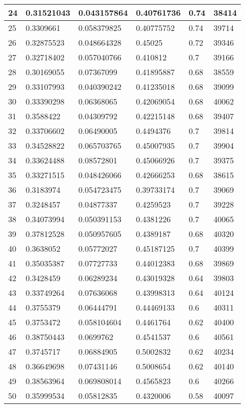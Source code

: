 \begin{longtable}{|l|l|l|l|l|l|}
24 & 0.31521043 & 0.043157864 & 0.40761736 & 0.74 & 38414 \\ \hline 
25 & 0.3309661 & 0.058379825 & 0.40775752 & 0.74 & 39714 \\ \hline 
26 & 0.32875523 & 0.048664328 & 0.45025 & 0.72 & 39346 \\ \hline 
27 & 0.32718402 & 0.057040766 & 0.410812 & 0.7 & 39166 \\ \hline 
28 & 0.30169055 & 0.07367099 & 0.41895887 & 0.68 & 38559 \\ \hline 
29 & 0.33107993 & 0.040390242 & 0.41235018 & 0.68 & 39099 \\ \hline 
30 & 0.33390298 & 0.06368065 & 0.42069054 & 0.68 & 40062 \\ \hline 
31 & 0.3588422 & 0.04309792 & 0.42215148 & 0.68 & 39407 \\ \hline 
32 & 0.33706602 & 0.06490005 & 0.4494376 & 0.7 & 39814 \\ \hline 
33 & 0.34528822 & 0.065703765 & 0.45007935 & 0.7 & 39904 \\ \hline 
34 & 0.33624488 & 0.08572801 & 0.45066926 & 0.7 & 39375 \\ \hline 
35 & 0.33271515 & 0.048426066 & 0.42666253 & 0.68 & 38615 \\ \hline 
36 & 0.3183974 & 0.054723475 & 0.39733174 & 0.7 & 39069 \\ \hline 
37 & 0.3248457 & 0.04877337 & 0.4259523 & 0.7 & 39228 \\ \hline 
38 & 0.34073994 & 0.050391153 & 0.4381226 & 0.7 & 40065 \\ \hline 
39 & 0.37812528 & 0.050957605 & 0.4389187 & 0.68 & 40320 \\ \hline 
40 & 0.3638052 & 0.05772027 & 0.45187125 & 0.7 & 40399 \\ \hline 
41 & 0.35035387 & 0.07727733 & 0.44012383 & 0.68 & 39869 \\ \hline 
42 & 0.3428459 & 0.06289234 & 0.43019328 & 0.64 & 39803 \\ \hline 
43 & 0.33749264 & 0.07636068 & 0.43998313 & 0.64 & 40124 \\ \hline 
44 & 0.3755379 & 0.06444791 & 0.44469133 & 0.6 & 40311 \\ \hline 
45 & 0.3753472 & 0.058104604 & 0.4461764 & 0.62 & 40400 \\ \hline 
46 & 0.38750443 & 0.0699762 & 0.4541537 & 0.6 & 40561 \\ \hline 
47 & 0.3745717 & 0.06884905 & 0.5002832 & 0.62 & 40234 \\ \hline 
48 & 0.36649698 & 0.07431146 & 0.5008654 & 0.62 & 40140 \\ \hline 
49 & 0.38563964 & 0.069808014 & 0.4565823 & 0.6 & 40266 \\ \hline 
50 & 0.35999534 & 0.05812835 & 0.4320006 & 0.58 & 40097 \\ \hline 
\end{longtable}